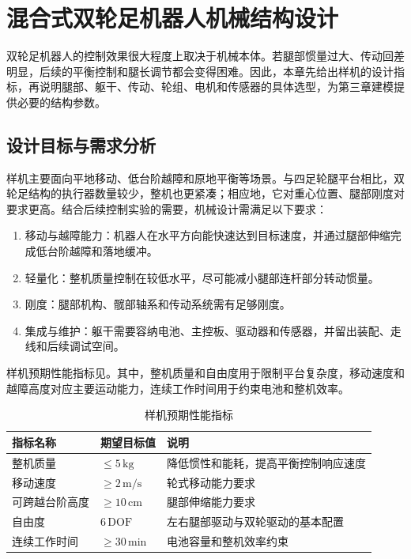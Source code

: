 \chapter{混合式双轮足机器人机械结构设计}\label{chap:mechanism}

双轮足机器人的控制效果很大程度上取决于机械本体。若腿部惯量过大、传动回差明显，后续的平衡控制和腿长调节都会变得困难。因此，本章先给出样机的设计指标，再说明腿部、躯干、传动、轮组、电机和传感器的具体选型，为第三章建模提供必要的结构参数。

\section{设计目标与需求分析}

样机主要面向平地移动、低台阶越障和原地平衡等场景。与四足轮腿平台相比，双轮足结构的执行器数量较少，整机也更紧凑；相应地，它对重心位置、腿部刚度对要求更高。结合后续控制实验的需要，机械设计需满足以下要求：

\begin{enumerate}
  \item 移动与越障能力：机器人在水平方向能快速达到目标速度，并通过腿部伸缩完成低台阶越障和落地缓冲。
  \item 轻量化：整机质量控制在较低水平，尽可能减小腿部连杆部分转动惯量。
  \item 刚度：腿部机构、髋部轴系和传动系统需有足够刚度。
  \item 集成与维护：躯干需要容纳电池、主控板、驱动器和传感器，并留出装配、走线和后续调试空间。
\end{enumerate}

样机预期性能指标见。其中，整机质量和自由度用于限制平台复杂度，移动速度和越障高度对应主要运动能力，连续工作时间用于约束电池和整机效率。

\begin{table}[H]
  \centering
  \caption{样机预期性能指标}\label{tab:design-targets}
  \renewcommand{\arraystretch}{1.3}
  \begin{tabular}{p{3cm}p{3cm}p{7cm}}
    \toprule
    指标名称 & 期望目标值 & 说明 \\
    \midrule
    整机质量 & $\leq 5\,\mathrm{kg}$ & 降低惯性和能耗，提高平衡控制响应速度 \\
    移动速度 & $\geq 2\,\mathrm{m/s}$ & 轮式移动能力要求 \\
    可跨越台阶高度 & $\geq 10\,\mathrm{cm}$ & 腿部伸缩能力要求 \\
    自由度 & $6\,\mathrm{DOF}$ & 左右腿部驱动与双轮驱动的基本配置 \\
    连续工作时间 & $\geq 30\,\mathrm{min}$ & 电池容量和整机效率约束 \\
    \bottomrule
  \end{tabular}
\end{table}

